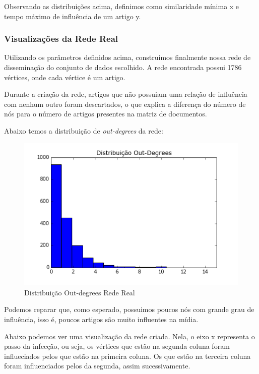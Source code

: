 \documentclass[a4paper,12pt]{article}
\begin{document}
Observando as distribuições acima, definimos como similaridade mínima x e tempo máximo de influência de um artigo y.

\pagebreak
\subsubsection{Visualizações da Rede Real}

Utilizando os parâmetros definidos acima, construimos finalmente nossa rede de disseminação do conjunto de dados escolhido.
A rede encontrada possui 1786 vértices, onde cada vértice é um artigo.

Durante a criação da rede, artigos que não possuiam uma relação de influência com nenhum outro foram descartados, o que explica a diferença
do número de nós para o número de artigos presentes na matriz de documentos.

Abaixo temos a distribuição de \textit{out-degrees} da rede:

\begin{figure}[ht]
 \centering
 \includegraphics[scale=0.7]{../Notebook/dist_outs.png}
 \caption{Distribuição Out-degrees Rede Real}
\end{figure}

Podemos reparar que, como esperado, possuimos poucos nós com grande grau de influência, isso é, poucos artigos são muito influentes na
mídia. 

Abaixo podemos ver uma visualização da rede criada. Nela, o eixo x representa o passo da infecção, ou seja, os vértices que estão na 
segunda coluna foram influeciados pelos que estão na primeira coluna. Os que estão na terceira coluna foram influenciados pelos da segunda, 
assim sucessivamente. 
\end{document}
